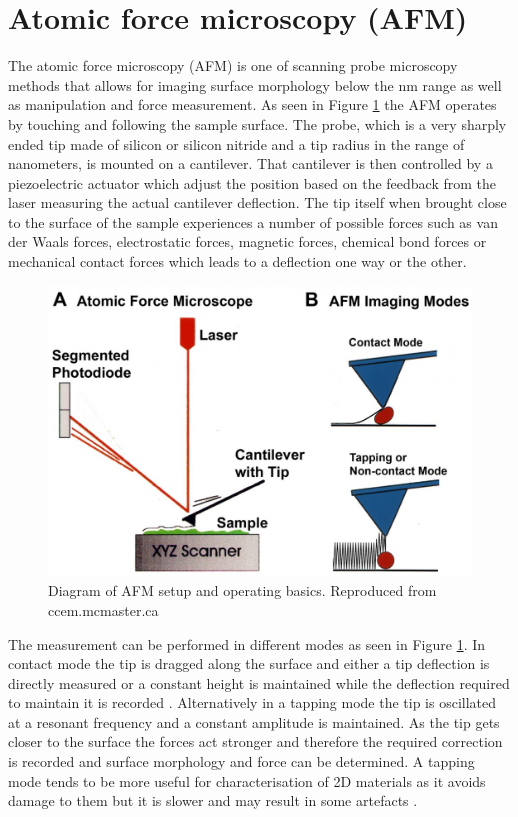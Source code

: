 \section{Atomic force microscopy (AFM)}

The atomic force microscopy (AFM) is one of scanning probe microscopy methods that allows for imaging surface morphology below the nm range as well as manipulation and force measurement. As seen in Figure \ref{fig:MethodologyAFMSetup} the AFM operates by touching and following the sample surface. The probe, which is a very sharply ended tip made of silicon or silicon nitride and a tip radius in the range of nanometers, is mounted on a cantilever. That cantilever is then controlled by a piezoelectric actuator which adjust the position based on the feedback from the laser measuring the actual cantilever deflection. The tip itself when brought close to the surface of the sample experiences a number of possible forces such as van der Waals forces, electrostatic forces, magnetic forces, chemical bond forces or mechanical contact forces which leads to a deflection one way or the other.

\begin{figure}[!ht]
	\begin{center}
		\includegraphics[scale=0.3]{Methodology/AFMSetup.png}
		\caption{Diagram of AFM setup and operating basics. Reproduced from ccem.mcmaster.ca}
		\label{fig:MethodologyAFMSetup}
	\end{center}
\end{figure}

The measurement can be performed in different modes as seen in Figure \ref{fig:MethodologyAFMSetup}. In contact mode the tip is dragged along the surface and either a tip deflection is directly measured or a constant height is maintained while the deflection required to maintain it is recorded \cite{Binnig1993}. Alternatively in a tapping mode the tip is oscillated at a resonant frequency and a constant amplitude is maintained. As the tip gets closer to the surface the forces act stronger and therefore the required correction is recorded and surface morphology and force can be determined. A tapping mode tends to be more useful for characterisation of 2D materials as it avoids damage to them but it is slower and may result in some artefacts \cite{Schmitz1997}.

